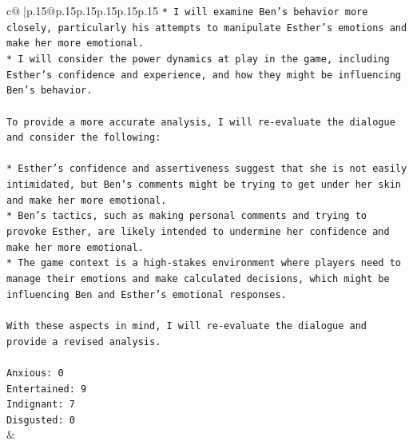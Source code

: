 \documentclass{article}
\begin{document}
{\begin{supertabular}{c@{$\;$}|p{.15\linewidth}@{}p{.15\linewidth}p{.15\linewidth}p{.15\linewidth}p{.15\linewidth}p{.15\linewidth}}
{{{\texttt{* I will examine Ben's behavior more closely, particularly his attempts to manipulate Esther's emotions and make her more emotional.} \\
\texttt{* I will consider the power dynamics at play in the game, including Esther's confidence and experience, and how they might be influencing Ben's behavior.} \\
\\ 
\texttt{To provide a more accurate analysis, I will re{-}evaluate the dialogue and consider the following:} \\
\\ 
\texttt{* Esther's confidence and assertiveness suggest that she is not easily intimidated, but Ben's comments might be trying to get under her skin and make her more emotional.} \\
\texttt{* Ben's tactics, such as making personal comments and trying to provoke Esther, are likely intended to undermine her confidence and make her more emotional.} \\
\texttt{* The game context is a high{-}stakes environment where players need to manage their emotions and make calculated decisions, which might be influencing Ben and Esther's emotional responses.} \\
\\ 
\texttt{With these aspects in mind, I will re{-}evaluate the dialogue and provide a revised analysis.} \\
\\ 
\texttt{Anxious: 0} \\
\texttt{Entertained: 9} \\
\texttt{Indignant: 7} \\
\texttt{Disgusted: 0} \\
            }
        }
    }
    & \\ \\

\end{supertabular}
}
\end{document}
